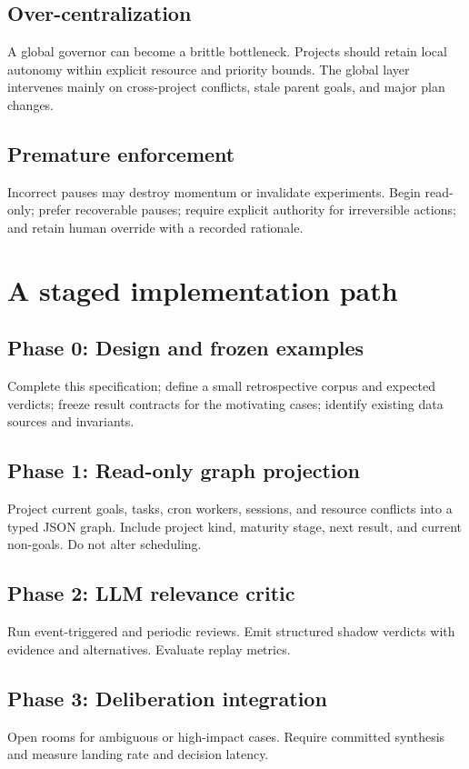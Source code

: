 \documentclass[11pt,letterpaper]{article}
\begin{document}
\subsection{Over-centralization}

A global governor can become a brittle bottleneck. Projects should retain
local autonomy within explicit resource and priority bounds. The global layer
intervenes mainly on cross-project conflicts, stale parent goals, and major
plan changes.

\subsection{Premature enforcement}

Incorrect pauses may destroy momentum or invalidate experiments. Begin
read-only; prefer recoverable pauses; require explicit authority for
irreversible actions; and retain human override with a recorded rationale.

\section{A staged implementation path}

\subsection*{Phase 0: Design and frozen examples}
Complete this specification; define a small retrospective corpus and expected
verdicts; freeze result contracts for the motivating cases; identify existing
data sources and invariants.

\subsection*{Phase 1: Read-only graph projection}
Project current goals, tasks, cron workers, sessions, and resource conflicts
into a typed JSON graph. Include project kind, maturity stage, next result, and
current non-goals. Do not alter scheduling.

\subsection*{Phase 2: LLM relevance critic}
Run event-triggered and periodic reviews. Emit structured shadow verdicts with
evidence and alternatives. Evaluate replay metrics.

\subsection*{Phase 3: Deliberation integration}
Open rooms for ambiguous or high-impact cases. Require committed synthesis and
measure landing rate and decision latency.
\end{document}
